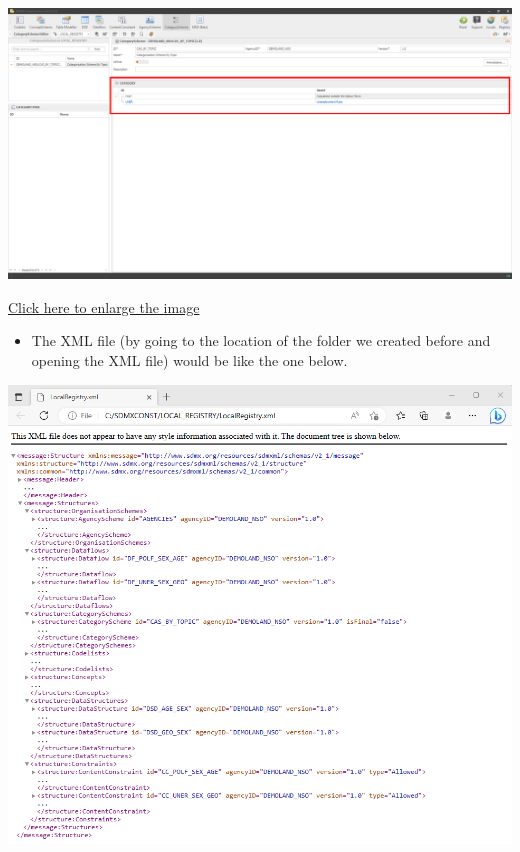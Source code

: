 \documentclass[
]{book}
\providecommand{\tightlist}{%
  \setlength{\itemsep}{0pt}\setlength{\parskip}{0pt}}
\begin{document}
\begin{center}\includegraphics[width=1\linewidth]{./images/image184} \end{center}

\href{images/image184.png}{Click here to enlarge the image}

\begin{itemize}
\tightlist
\item
  The XML file (by going to the location of the folder we created before and opening the XML file) would be like the one below.
\end{itemize}

\begin{center}\includegraphics[width=1\linewidth]{./images/image186} \end{center}
\end{document}
